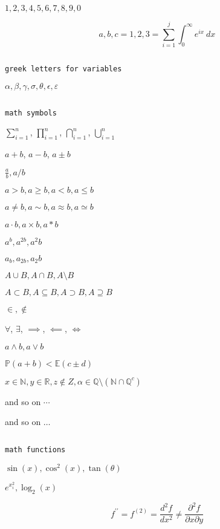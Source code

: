\documentclass[11pt, oneside]{article}   	%
\newcommand{\bR}{\mathbb{R}} %
\newcommand{\bQ}{\mathbb{Q}} %
\newcommand{\bQc}{\mathbb{Q}^c} %
\newcommand{\bN}{\mathbb{N}} %
\newcommand{\bP}{\mathbb{P}} %
\newcommand{\bE}{\mathbb{E}} %
\begin{document}
$1,2,3,4,5,6,7,8,9,0$ %

$$a,b,c = 1,2,3 = \sum_{i=1}^j \int_0^{\infty} e^{ix} \ dx$$

$\ $ %

\texttt{greek letters for variables}

$\alpha, \beta, \gamma, \sigma, \theta, \epsilon, \varepsilon$

$\ $

\texttt{math symbols}

$\sum_{i=1}^n$, $\prod_{i=1}^n$, $\bigcap_{i=1}^n$, $\bigcup_{i=1}^n$

$a+b$, $a-b$, $a \pm b$

$\frac{a}{b}, a/b$

$a > b, a \geq b, a < b, a \leq b$

$a \ne b, a \sim b, a \approx b, a \simeq b$

$a \cdot b, a \times b, a * b$

$a^b, a^{2b}, a^2b$

$a_b, a_{2b}, a_2b$ 

$A \cup B, A \cap B, A \setminus B$

$A \subset B, A \subseteq B, A \supset B, A \supseteq B$

$\in, \notin$

$\forall$, $\exists$, $\implies$, $\impliedby$, $\iff$

$a \land b, a \lor b$

$\bP(a+b) < \bE(c \pm d)$

$x \in \bN, y \in \bR, z \notin Z, \alpha \in \bQ\setminus(\bN \cap \bQc)$

and so on $\cdots$

and so on $\ldots$

$\ $

\texttt{math functions}

$\sin(x), \cos^2(x), \tan(\theta)$

$e^{x_i^2}, \log_2(x)$

$$f^{\prime\prime} = f^{(2)} = \frac{d^2 f}{dx^2} \ne \frac{\partial^2 f}{\partial x \partial y}$$

$\ $
\end{document}
